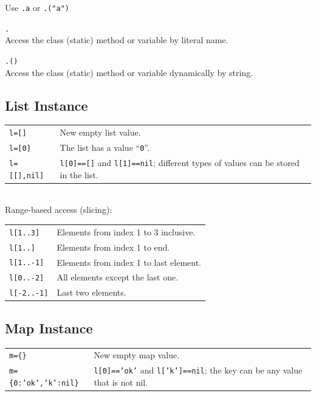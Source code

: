 Use \texttt{.a} or \texttt{.("a")}

\hangpar {}\texttt{.}\\
Access the class (static) method or variable by literal name.

\hangpar {}\texttt{.(}\texttt{)}\\
Access the class (static) method or variable dynamically by string.


\subsection*{List Instance}
\begin{tabular}{@{}lp{}}
\texttt{l=[]} & New empty list value. \\
\texttt{l=[0]} & The list has a value ``\texttt{0}''. \\
\texttt{l=[[],nil]} & \texttt{l[0]==[]} and \texttt{l[1]==nil}; different types of values can be stored in the list. \\
\end{tabular}\\

\hangpar Range-based access (slicing):

\begin{tabular}{@{}lp{}}
\texttt{l[1..3]} & Elements from index 1 to 3 inclusive. \\
\texttt{l[1..]} & Elements from index 1 to end. \\
\texttt{l[1..-1]} & Elements from index 1 to last element. \\
\texttt{l[0..-2]} & All elements except the last one. \\
\texttt{l[-2..-1]} & Last two elements. \\
\end{tabular}

\subsection*{Map Instance}
\begin{tabular}{@{}lp{}}
    \texttt{m=\{\}} & New empty map value. \\
    \texttt{m=\{0:'ok','k':nil\}} & \texttt{l[0]=='ok'} and \texttt{l['k']==nil}; the key can be any value that is not nil.\\
\end{tabular}


